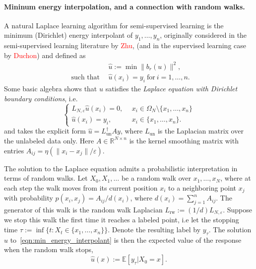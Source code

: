 \documentclass{article}
\newcommand{\Reals}{\mathbb{R}}
\newcommand{\1}{\mathbf{1}}
\newcommand{\Ebb}{\mathbb{E}}
\newcommand{\wh}[1]{\widehat{#1}}
\theoremstyle{definition}
\theoremstyle{remark}
\begin{document}
\paragraph{Mininum energy interpolation, and a connection with random walks.}

A natural Laplace learning algorithm for semi-supervised learning is the minimum (Dirichlet) energy interpolant of $y_1,\ldots,y_n$, originally considered in the semi-supervised learning literature by \textcolor{red}{Zhu}, (and in the supervised learning case by \textcolor{red}{Duchon}) and defined as 
\begin{equation}
\label{eqn:min_energy_interpolant}
\begin{aligned}
& \wh{u} := \min \|b_r(u)\|^2, \\
~~\textrm{such that}~~ &\wh{u}(x_i) = y_i ~\textrm{for}~ i = 1,\ldots,n.
\end{aligned}
\end{equation}
Some basic algebra shows that ${u}$ satisfies the \emph{Laplace equation with Dirichlet boundary conditions}, i.e. 
\begin{equation}
\label{eqn:laplace_equation}
\begin{cases}
L_{N,\varepsilon}{\wh{u}}(x_i) = 0,& ~~\textrm{$x_i \in \Omega_N \setminus \{x_1,\ldots,x_n\}$} \\
\wh{u}(x_i) = y_i,&~~\textrm{$x_i \in \{x_1,\ldots,x_n\}$.}
\end{cases}
\end{equation}
and takes the explicit form $\wh{u} = L_{\mathrm{un}}^{\dagger} A y$, where $L_{\mathrm{un}}$ is the Laplacian matrix over the unlabeled data only. Here $A \in \Reals^{N \times n}$ is the kernel smoothing matrix with entries $A_{ij} = \eta(\|x_i - x_j\| / \varepsilon)$.

The solution to the Laplace equation admits a probabilistic interpretation in terms of random walks. Let $X_0,X_1,\ldots$ be a random walk over $x_1,\ldots,x_N$, where at each step the walk moves from its current position $x_i$ to a neighboring point $x_j$ with probability $p(x_i,x_j) = A_{ij}/d(x_i)$, where $d(x_i) = \sum_{j = 1}^{n} A_{ij}$. The generator of this walk is the random walk Laplacian $L_{\mathrm{rw}} := (1/d) L_{N,\varepsilon}$. Suppose we stop this walk the first time it reaches a labeled point, i.e let the stopping time $\tau := \inf\{t: X_t \in \{x_1,\ldots,x_n\}\}$. Denote the resulting label by $y_{\tau}$. The solution $\wh{u}$ to~\eqref{eqn:min_energy_interpolant} is then the expected value of the response when the random walk stops,
\begin{equation}
\label{eqn:random_walk_interpretation_laplace_learning}
\wh{u}(x) := \Ebb[y_{\tau}|X_0 = x].
\end{equation}
\end{document}
